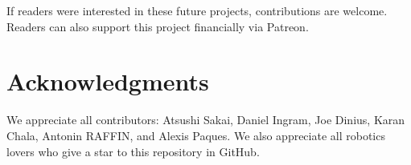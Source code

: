\documentclass{bmvc2k}
\begin{document}
If readers were interested in these future projects, contributions are welcome.
Readers can also support this project financially via Patreon\cite{patreon}.

\section{Acknowledgments}

We appreciate all contributors: Atsushi Sakai\cite{auther5}, Daniel Ingram\cite{auther1}, Joe Dinius\cite{auther2}, Karan Chala\cite{auther3}, Antonin RAFFIN\cite{auther4}, and Alexis Paques\cite{auther6}.
We also appreciate all robotics lovers who give a star to this repository in GitHub.



\end{document}
